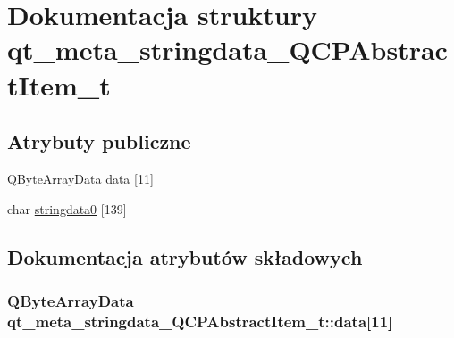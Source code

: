 \hypertarget{structqt__meta__stringdata___q_c_p_abstract_item__t}{}\section{Dokumentacja struktury qt\+\_\+meta\+\_\+stringdata\+\_\+\+Q\+C\+P\+Abstract\+Item\+\_\+t}
\label{structqt__meta__stringdata___q_c_p_abstract_item__t}
\subsection*{Atrybuty publiczne}
\begin{DoxyCompactItemize}
\item 
Q\+Byte\+Array\+Data \hyperlink{structqt__meta__stringdata___q_c_p_abstract_item__t_a9e33f2a80b5df62d63aafd9326b07a92}{data} \mbox{[}11\mbox{]}
\item 
char \hyperlink{structqt__meta__stringdata___q_c_p_abstract_item__t_a4a1f8f9acd2583f039a05de696c20ba6}{stringdata0} \mbox{[}139\mbox{]}
\end{DoxyCompactItemize}


\subsection{Dokumentacja atrybutów składowych}
\subsubsection[{\texorpdfstring{data}{data}}]{\setlength{\rightskip}{0pt plus 5cm}Q\+Byte\+Array\+Data qt\+\_\+meta\+\_\+stringdata\+\_\+\+Q\+C\+P\+Abstract\+Item\+\_\+t\+::data\mbox{[}11\mbox{]}}\hypertarget{structqt__meta__stringdata___q_c_p_abstract_item__t_a9e33f2a80b5df62d63aafd9326b07a92}{}\label{structqt__meta__stringdata___q_c_p_abstract_item__t_a9e33f2a80b5df62d63aafd9326b07a92}

